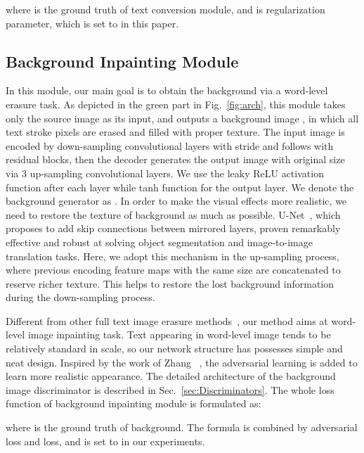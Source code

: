 \documentclass[sigconf]{acmart}
\begin{document}
where  is the ground truth of text conversion module, and  is regularization parameter, which is set to  in this paper.


\subsection{Background Inpainting Module}
\label{sec:Background Inpainting Module}
In this module, our main goal is to obtain the background via a word-level erasure task. As depicted in the green part in Fig.~\ref{fig:arch}, this module takes only the source image  as its input, and outputs a background image , in which all text stroke pixels are erased and filled with proper texture. The input image is encoded by  down-sampling convolutional layers with stride  and follows with  residual blocks, then the decoder generates the output image with original size via 3 up-sampling convolutional layers. We use the leaky ReLU activation function after each layer while tanh function for the output layer. We denote the background generator as .
In order to make the visual effects more realistic, we need to restore the texture of background as much as possible.
U-Net~\cite{ronneberger2015u}, which proposes to add skip connections between mirrored layers, proven remarkably effective and robust at solving object segmentation and image-to-image translation tasks. 
Here, we adopt this mechanism in the up-sampling process, where previous encoding feature maps with the same size are concatenated to reserve richer texture. This helps to restore the lost background information during the down-sampling process.

Different from other full text image erasure methods~\cite{zhang2019EnsNet,nakamura2017scene}, our method aims at word-level image inpainting task. Text appearing in word-level image tends to be relatively standard in scale, so our network structure has possesses simple and neat design. Inspired by the work of Zhang  ~\cite{zhang2019EnsNet},
the adversarial learning is added to learn more realistic appearance.
The detailed architecture of the background image discriminator  is described in Sec.~\ref{sec:Discriminators}. The whole loss function of background inpainting module is formulated as:

where  is the ground truth of background. The formula is combined by adversarial loss and  loss, and  is set to  in our experiments.
\end{document}
